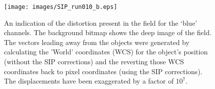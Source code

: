 \begin{figure}
  \centering
  \texttt{[image: images/SIP\_run010\_b.eps]}
  \caption{An indication of the distortion present in the field for the `blue' channels. The background bitmap shows the deep image of the field. The vectors leading away from the objects were generated by calculating the 'World' coordinates (WCS) for the object's position (without the SIP corrections) and the reverting those WCS coordinates back to pixel coordinates (using the SIP corrections). The displacements have been exaggerated by a factor of $10^7$.}
\label{fig:sipfitb}
\end{figure}


